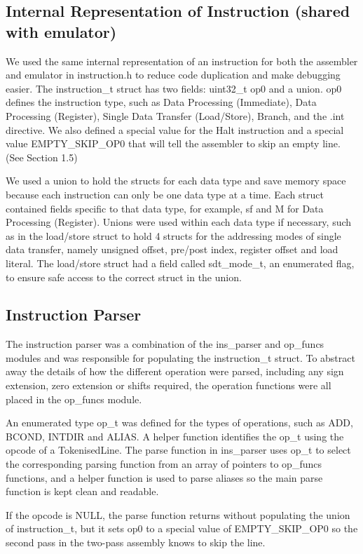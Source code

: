 \documentclass[11pt]{article}
\begin{document}
\subsection{Internal Representation of Instruction (shared with emulator)}
We used the same internal representation of an instruction for both the assembler and emulator in instruction.h to reduce code duplication and make debugging easier. The instruction\_t struct has two fields: uint32\_t op0 and a union. op0 defines the instruction type, such as Data Processing (Immediate), Data Processing (Register), Single Data Transfer (Load/Store), Branch, and the .int directive. We also defined a special value for the Halt instruction and a special value EMPTY\_SKIP\_OP0 that will tell the assembler to skip an empty line. (See Section 1.5)

We used a union to hold the structs for each data type and save memory space because each instruction can only be one data type at a time. Each struct contained fields specific to that data type, for example, sf and M for Data Processing (Register). Unions were used within each data type if necessary, such as in the load/store struct to hold 4 structs for the addressing modes of single data transfer, namely unsigned offset, pre/post index, register offset and load literal. The load/store struct had a field called sdt\_mode\_t, an enumerated flag, to ensure safe access to the correct struct in the union.

\subsection{Instruction Parser}
The instruction parser was a combination of the ins\_parser and op\_funcs modules and was responsible for populating the instruction\_t struct. To abstract away the details of how the different operation were parsed, including any sign extension, zero extension or shifts required, the operation functions were all placed in the op\_funcs module. 

An enumerated type op\_t was defined for the types of operations, such as ADD, BCOND, INTDIR and ALIAS. A helper function identifies the op\_t using the opcode of a TokenisedLine. The parse function in ins\_parser uses op\_t to select the corresponding parsing function from an array of pointers to op\_funcs functions, and a helper function is used to parse aliases so the main parse function is kept clean and readable. 

If the opcode is NULL, the parse function returns without populating the union of instruction\_t, but it sets op0 to a special value of EMPTY\_SKIP\_OP0 so the second pass in the two-pass assembly knows to skip the line.
\end{document}
